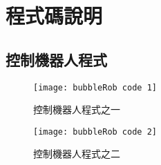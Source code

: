 \chapter{程式碼說明}
\renewcommand{\baselinestretch}{10.0} %
\setcounter{page}{5}  %
\fontsize{14pt}{2.5pt}\sectionef
\section{控制機器人程式}
\begin{figure}[hbt!]
\begin{center}
\texttt{[image: bubbleRob code 1]}
\caption{\Large 控制機器人程式之一}\label{控制機器人程式之一}
\end{center}
\end{figure} 
\begin{figure}[hbt!]
\begin{center}
\texttt{[image: bubbleRob code 2]}
\caption{\Large 控制機器人程式之二}\label{控制機器人程式之二}
\end{center}
\end{figure} 
\renewcommand{\baselinestretch}{1} %